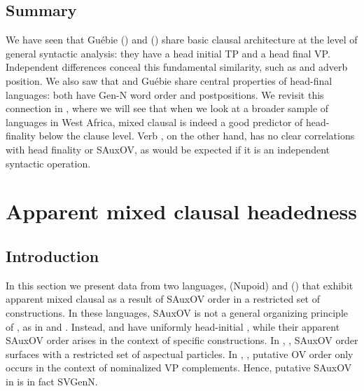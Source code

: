 \documentclass[output=paper]{LSP/langsci}
\begin{document}
\subsection{Summary}

We have seen that Gu\'ebie () and  () share basic clausal architecture at the level of general syntactic analysis: they have a head initial TP and a head final VP. Independent differences conceal this fundamental similarity, such as  and adverb position. We also saw that  and Gu\'ebie share central properties of head-final languages: both have Gen-N word order and postpositions. We revisit this connection in , where we will see that when we look at a broader sample of languages in West Africa, mixed clausal  is indeed a good predictor of head-finality below the clause level. Verb , on the other hand, has no clear correlations with head finality or SAuxOV, as would be expected if it is an independent syntactic operation.

\section{Apparent mixed clausal headedness} 
\label{sec:fake}

\subsection{Introduction}

In this section we present data from two languages,  (Nupoid) and  () that exhibit apparent mixed clausal  as a result of SAuxOV order in a restricted set of constructions. In these languages, SAuxOV is not a general organizing principle of , as in  and . Instead,  and  have uniformly head-initial , while their apparent SAuxOV order arises in the context of specific constructions. In , , SAuxOV order surfaces with a restricted set of aspectual particles. In , , putative OV order only occurs in the context of nominalized VP complements. Hence, putative SAuxOV in  is in fact SVGenN. 
\end{document}
